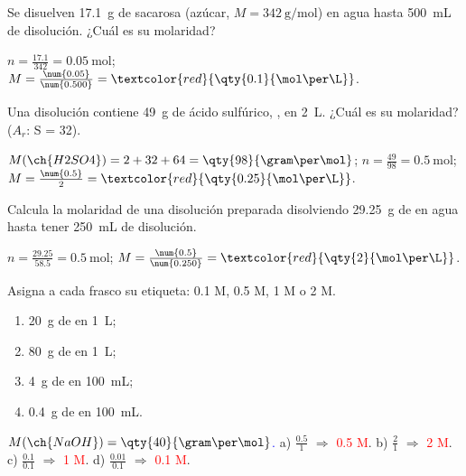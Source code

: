 \begin{exercise}
    Se disuelven \qty{17.1}{\gram} de sacarosa (azúcar, \(M = \qty{342}{\gram\per\mol}\)) en agua hasta \qty{500}{\mL} de disolución. ¿Cuál es su molaridad?
    \begin{solu}
        \(n = \frac{\num{17.1}}{342} = \qty{0.05}{\mol}\); \(M = \frac{\num{0.05}}{\num{0.500}} = \textcolor{red}{\qty{0.1}{\mol\per\L}}\).
    \end{solu}
\end{exercise}

\begin{exercise}
    Una disolución contiene \qty{49}{\gram} de ácido sulfúrico, , en \qty{2}{\L}. ¿Cuál es su molaridad? (\(A_r\): S = 32).
    \begin{solu}
        \(M(\ch{H2SO4}) = 2 + 32 + 64 = \qty{98}{\gram\per\mol}\); \(n = \frac{49}{98} = \qty{0.5}{\mol}\); \(M = \frac{\num{0.5}}{2} = \textcolor{red}{\qty{0.25}{\mol\per\L}}\).
    \end{solu}
\end{exercise}

\begin{exercise}
    Calcula la molaridad de una disolución preparada disolviendo \qty{29.25}{\gram} de  en agua hasta tener \qty{250}{\mL} de disolución.
    \begin{solu}
        \(n = \frac{\num{29.25}}{\num{58.5}} = \qty{0.5}{\mol}\); \(M = \frac{\num{0.5}}{\num{0.250}} = \textcolor{red}{\qty{2}{\mol\per\L}}\).
    \end{solu}
\end{exercise}

\begin{exercise}
    Asigna a cada frasco su etiqueta: \num{0.1} M, \num{0.5} M, 1 M o 2 M.
    \begin{enumerate}[label=\alph*)]
        \item \qty{20}{\gram} de  en \qty{1}{\L};
        \item \qty{80}{\gram} de  en \qty{1}{\L};
        \item \qty{4}{\gram} de  en \qty{100}{\mL};
        \item \qty{0.4}{\gram} de  en \qty{100}{\mL}.
    \end{enumerate}
    \begin{solu}
        \textcolor{blue}{\(M(\ch{NaOH}) = \qty{40}{\gram\per\mol}\).} a) \(\frac{\num{0.5}}{1}\) \(\Rightarrow\) \textcolor{red}{\num{0.5} M}. b) \(\frac{2}{1}\) \(\Rightarrow\) \textcolor{red}{2 M}. c) \(\frac{\num{0.1}}{\num{0.1}}\) \(\Rightarrow\) \textcolor{red}{1 M}. d) \(\frac{\num{0.01}}{\num{0.1}}\) \(\Rightarrow\) \textcolor{red}{\num{0.1} M}.
    \end{solu}
\end{exercise}

